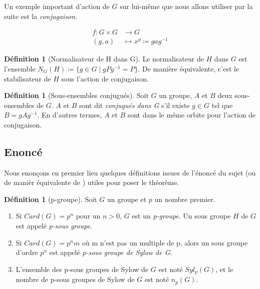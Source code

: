 \documentclass[french]{article}
\theoremstyle{definition}
\newtheorem{definition}[subsubsection]{Définition}
\theoremstyle{plain}
\theoremstyle{plain}
\theoremstyle{plain}
\theoremstyle{plain}
\theoremstyle{plain}
\begin{document}
Un exemple important d'action de \( G \) sur lui-même que nous allons utiliser par la suite est la \textit{conjugaison}.


\begin{align*}
	f : G \times G &\to G \\
	(g,a) &\mapsto x^{g} \coloneq gag^{-1}
\end{align*}

\begin{definition}[Normalisateur de H dans G]
	Le normalisateur de \( H \) dans \( G \) est l'ensemble 
	\( N_{G}({H}) \coloneq \{ g \in G \mid gPg^{-1} = P \} \).
	De manière équivalente, c'est le stabilisateur de \( H \) sous l'action de conjugaison.
\end{definition}

\begin{definition}[Sous-ensembles conjugués]
	Soit \( G \) un groupe, \( A \) et \( B \) deux sous-ensembles de \( G \). 
	\( A \) et \( B \) sont dit 
	\textit{conjugués dans G} s'il existe \( g \in G \) tel que \( B = gAg^{-1} \).
	En d'autres termes, \( A \) et \( B \) sont dans le même orbite pour l'action de conjugaison.
\end{definition}


\subsection{Enoncé}

Nous enonçons en premier lieu quelques définitions issues de l'énoncé du sujet (ou de manièr équivalente de \cite[p. ~123 et 139]{dummit2003abstract}) utiles pour poser le théorème.

\begin{definition}[p-groupe]
	Soit \( G \) un groupe et \( p \) un nombre premier.
	\begin{enumerate}[label = (\roman*)]
	\item Si \( Card(G) = p^{n} \) pour un \( n > 0 \), \( G \) est un \textit{p-groupe}. Un sous groupe \( H \) de \( G \) est appelé \textit{p-sous groupe}.
	\item Si \( Card(G) = p^{n}m \) où m n'est pas un multiple de p, alors un sous groupe d'ordre \( p^{n} \) est appelé \textit{p-sous groupe de Sylow de G}.
	\item L'ensemble des p-sous groupes de Sylow de \( G \) est noté \( Syl_{p}(G) \), et le nombre de p-sous groupes de Sylow de \( G \) est noté \( n_{p}(G) \).
	\end{enumerate}
\end{definition}
\end{document}
